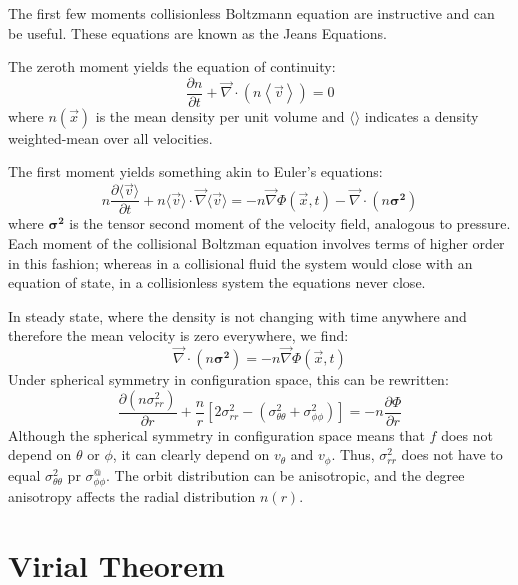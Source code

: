 The first few moments collisionless Boltzmann equation are instructive
and can be useful. These equations are known as the Jeans Equations.

The zeroth moment yields the equation of continuity:
\begin{equation}
\frac{\partial n}{\partial t}
+ \vec{\nabla} \cdot\left(n \left\langle\vec{v}\right\rangle\right) =
0
\end{equation}
where $n(\vec{x})$ is the mean density per unit volume and
$\langle\rangle$ indicates a density weighted-mean over all
velocities.

The first moment yields something akin to Euler's equations:
\begin{equation}
n \frac{\partial \langle\vec{v}\rangle}{\partial t}
 + n \langle \vec{v} \rangle \cdot
 \vec{\nabla} \langle\vec{v}\rangle
  = -n \vec{\nabla}\Phi(\vec{x}, t) - \vec{\nabla} \cdot(n
 {\mathbf{\sigma^2}})
\end{equation}
where ${\mathbf{\sigma^2}}$ is the tensor second moment of the velocity
field, analogous to pressure. Each moment of the collisional Boltzman
equation involves terms of higher order in this fashion; whereas in a
collisional fluid the system would close with an equation of state, in
a collisionless system the equations never close. 

In steady state, where the density is not changing with time anywhere
and therefore the mean velocity is zero everywhere, we find:
\begin{equation}
 \vec{\nabla} \cdot(n
 {\mathbf{\sigma^2}}) = -n \vec{\nabla}\Phi(\vec{x}, t)
\end{equation}
Under spherical symmetry in configuration space, this can be
rewritten:
\begin{equation}
\frac{\partial(n \sigma_{rr}^2)}{\partial r}
+ \frac{n}{r} \left[2 \sigma_{rr}^2
- \left(\sigma_{\theta\theta}^2 + \sigma_{\phi\phi}^2\right)\right] =
- n \frac{\partial \Phi}{\partial r}
\end{equation}
Although the spherical symmetry in configuration space means that $f$
does not depend on $\theta$ or $\phi$, it can clearly depend on
$v_\theta$ and $v_\phi$. Thus, $\sigma_{rr}^2$ does not have to equal
$\sigma_{\theta\theta}^2$ pr $\sigma_{\phi\phi}^@$. The orbit
distribution can be anisotropic, and the degree anisotropy affects the
radial distribution $n(r)$. 

\section{Virial Theorem}


